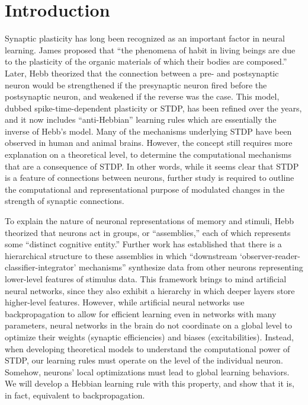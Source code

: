 \documentclass[12pt]{article}
\begin{document}
\section{Introduction}
Synaptic plasticity has long been recognized as an important factor in neural learning. James \cite{James1890} proposed that ``the phenomena of habit in living beings are due to the plasticity of the organic materials of which their bodies are composed.'' Later, Hebb \cite{Hebb1949} theorized that the connection between a pre- and postsynaptic neuron would be strengthened if the presynaptic neuron fired before the postsynaptic neuron, and weakened if the reverse was the case. This model, dubbed spike-time-dependent plasticity or STDP, has been refined over the years,\cite{Markram2012} and it now includes ``anti-Hebbian'' learning rules which are essentially the inverse of Hebb's model.\cite{Carlson1990} Many of the mechanisms underlying STDP have been observed in human and animal brains.\cite{Markram2011} However, the concept still requires more explanation on a theoretical level, to determine the computational mechanisms that are a consequence of STDP. In other words, while it seems clear that STDP is a feature of connections between neurons, further study is required to outline the computational and representational purpose of modulated changes in the strength of synaptic connections.

To explain the nature of neuronal representations of memory and stimuli, Hebb theorized that neurons act in groups, or ``assemblies,'' each of which represents some ``distinct cognitive entity.'' \cite{Hebb1949} Further work has established that there is a hierarchical structure to these assemblies in which ``downstream `observer-reader-classifier-integrator' mechanisms'' synthesize data from other neurons representing lower-level features of stimulus data. \cite{Buzsaki2010} This framework brings to mind artificial neural networks, since they also exhibit a hierarchy in which deeper layers store higher-level features. \cite{HighLevelFeaturesANN} However, while artificial neural networks use backpropagation to allow for efficient learning even in networks with many parameters, \cite{backprop} neural networks in the brain do not coordinate on a global level to optimize their weights (synaptic efficiencies) and biases (excitabilities). \cite{Dahmen2022} Instead, when developing theoretical models to understand the computational power of STDP, our learning rules must operate on the level of the individual neuron. Somehow, neurons' local optimizations must lead to global learning behaviors. We will develop a Hebbian learning rule with this property, and show that it is, in fact, equivalent to backpropagation.
\end{document}

